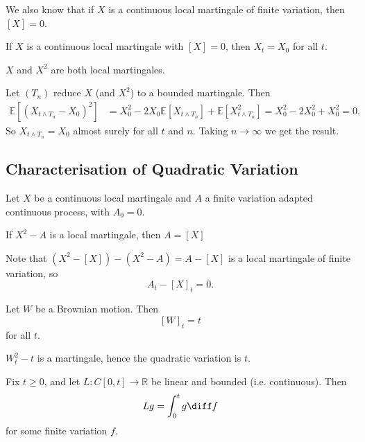 \documentclass[12pt]{article}
\begin{document}
We also know that if $X$ is a continuous local martingale of finite variation, then $[X] = 0$.

\begin{proposition}
	If $X$ is a continuous local martingale with $[X] = 0$, then $X_t = X_0$ for all $t$.
\end{proposition}

\begin{proofbox}
	$X$ and $X^2$ are both local martingales.

	Let $(T_n)$ reduce $X$ (and $X^2$) to a bounded martingale. Then
	\begin{align*}
		\mathbb{E}[(X_{t \wedge T_n} - X_0)^2] &= X_0^2 - 2 X_0 \mathbb{E}[X_{t \wedge T_n}] + \mathbb{E}[X_{t \wedge T_n}^2] = X_0^2 - 2X_0^2 + X_0^2 = 0.
	\end{align*}
	So $X_{t \wedge T_n} = X_0$ almost surely for all $t$ and $n$. Taking $n \to \infty$ we get the result.
\end{proofbox}

\subsection{Characterisation of Quadratic Variation}%
\label{sub:cqv}

\begin{proposition}
Let $X$ be a continuous local martingale and $A$ a finite variation adapted continuous process, with $A_0 = 0$.

If $X^2 - A$ is a local martingale, then $A = [X]$ 
\end{proposition}

\begin{proofbox}
	Note that $(X^2 - [X]) - (X^2 - A) = A - [X]$ is a local martingale of finite variation, so
	\[
		A_t - [X]_t = 0.
	\]
\end{proofbox}

\begin{proposition}
	Let $W$ be a Brownian motion. Then
	\[
		[W]_t = t
	\]
	for all $t$.
\end{proposition}

\begin{proofbox}
	$W_t^2 - t$ is a martingale, hence the quadratic variation is $t$.
\end{proofbox}

\begin{remark}
	Fix $t \geq 0$, and let $L : C[0, t] \to \mathbb{R}$ be linear and bounded (i.e. continuous). Then
	\[
	Lg = \int_0^t g \diff f
	\]
	for some finite variation $f$.
\end{remark}
\end{document}
